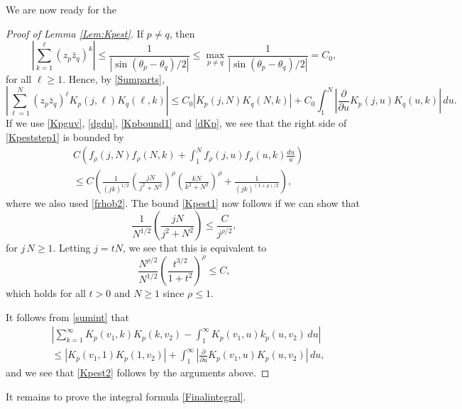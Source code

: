 \documentclass{article}
\numberwithin{equation}{section}
\numberwithin{figure}{section}
\theoremstyle{plain}
\theoremstyle{plain}
\numberwithin{thm}{section}
\theoremstyle{remark}
\let \le \leqslant
\let \ge \geqslant
\begin{document}
We are now ready for the 
\begin{proof}[Proof of Lemma \ref{Lem:Kpest}]
If $p\neq q$, then
\begin{equation*}
\left|\sum_{k=1}^\ell(z_p\bar{z}_q)^k\right|\le\frac 1{|\sin(\theta_p-\theta_q)/2|}\le\max_{p\neq q}\frac 1{|\sin(\theta_p-\theta_q)/2|}=C_0,
\end{equation*}
for all $\ell\ge 1$. Hence, by \eqref{Sumparts},
\begin{equation}\label{Kpeststep1}
\left|\sum_{\ell=1}^N(z_p\bar{z}_q)^\ell K_p(j,\ell)K_q(\ell,k)\right|\le C_0|K_p(j,N)K_q(N,k)|+C_0\int_1^N\left|\frac{\partial}{\partial u}K_p(j,u)K_q(u,k)\right|\,du.
\end{equation}
If we use \eqref{Kpguv}, \eqref{dgdu}, \eqref{Kpbound1} and \eqref{dKp}, we see that the right side of \eqref{Kpeststep1} is bounded by
\begin{align*}
&C(f_\rho(j,N)f_\rho(N,k)+\int_1^Nf_\rho(j,u)f_\rho(u,k)\frac{du}u)\\
&\le C\left(\frac 1{(jk)^{1/2}}\left(\frac{jN}{j^2+N^2}\right)^\rho\left(\frac{kN}{k^2+N^2}\right)^\rho+\frac 1{(jk)^{(1+\rho)/2}}\right),
\end{align*}
where we also used \eqref{frhob2}.
The bound \eqref{Kpest1} now follows if we can show that
\begin{equation*}
\frac 1{N^{1/2}}\left(\frac{jN}{j^2+N^2}\right)\le\frac C{j^{\rho/2}},
\end{equation*}
for $j\, N\ge 1$. Letting $j=tN$, we see that this is equivalent to
\begin{equation*}
\frac{N^{\rho/2}}{N^{1/2}}\left(\frac{t^{3/2}}{1+t^2}\right)^\rho\le C,
\end{equation*}
which holds for all $t>0$ and $N\ge 1$ since $\rho\le 1$.

It follows from \eqref{sumint} that
\begin{align*}
&\left|\sum_{k=1}^\infty K_p(v_1,k)K_p(k,v_2)-\int_1^\infty K_p(v_1,u)k_p(u,v_2)\,du\right|\\
&\le |K_p(v_1,1)K_p(1,v_2)|+\int_1^\infty\left|\frac{\partial}{\partial u} K_p(v_1,u)K_p(u,v_2)\right|\,du,
\end{align*}
and we see that \eqref{Kpest2} follows by the arguments above.
\end{proof}

It remains to prove the integral formula \eqref{Finalintegral}.
\end{document}
